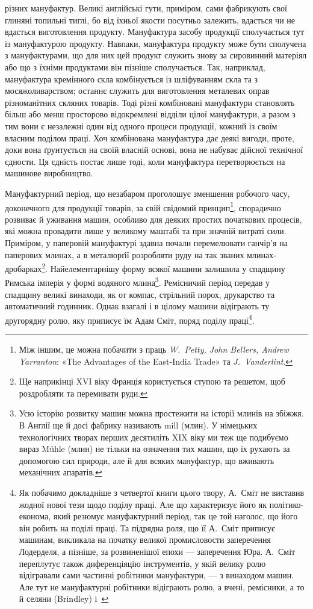 \parcont{}  %
різних мануфактур. Великі англійські гути, приміром, сами
фабрикують свої глиняні топильні тиглі, бо від їхньої якости
посутньо залежить, вдасться чи не вдасться виготовлення продукту.
Мануфактура засобу продукції сполучається тут із мануфактурою
продукту. Навпаки, мануфактура продукту може бути
сполучена з мануфактурами, що для них цей продукт служить
знову за сировинний матеріял або що з їхніми продуктами він
пізніше сполучається. Так, наприклад, мануфактура кремінного
скла комбінується із шліфуванням скла та з мосяжоливарством;
останнє служить для виготовлення металевих оправ різноманітних
скляних товарів. Тоді різні комбіновані мануфактури
становлять більш або менш просторово відокремлені відділи цілої
мануфактури, а разом з тим вони є незалежні один від одного
процеси продукції, кожний із своїм власним поділом праці. Хоч
комбінована мануфактура дає деякі вигоди, проте, доки вона
ґрунтується на своїй власній основі, вона не набуває дійсної
технічної єдности. Ця єдність постає лише тоді, коли мануфактура
перетворюється на машинове виробництво.

Мануфактурний період, що незабаром проголошує зменшення
робочого часу, доконечного для продукції товарів, за свій свідомий
принцип\footnote{
Між іншим, це можна побачити з праць \emph{W.~Petty, John Bellers,
Andrew Yarranton}: «The Advantages of the East-India Trade» та \emph{J.~Vanderlint}.
}, спорадично розвиває й уживання машин, особливо
для деяких простих початкових процесів, які можна провадити
лише у великому маштабі та при значній витраті сили. Приміром,
у паперовій мануфактурі здавна почали перемелювати ганчір’я
на паперових млинах, а в металюрґії розробляти руду на так
званих млинах-дробарках\footnote{
Ще наприкінці XVI віку Франція користується ступою та решетом,
щоб роздробляти та перемивати руди.
}. Найелементарнішу форму всякої
машини залишила у спадщину Римська імперія у формі водяного
млина\footnote{
Усю історію розвитку машин можна простежити на історії млинів
на збіжжя. В Англії ще й досі фабрику називають mill (млин). У
німецьких технологічних творах перших десятиліть XIX віку ми теж
ще подибуємо вираз Mühle (млин) не тільки на означення тих машин,
що їх рухають за допомогою сил природи, але й для всяких мануфактур,
що вживають механічних апаратів.
}. Ремісничий період передав у спадщину великі винаходи,
як от компас, стрільний порох, друкарство та автоматичний
годинник. Однак взагалі і в цілому машини відіграють ту другорядну
ролю, яку приписує їм Адам Сміт, поряд поділу праці\footnote{
Як побачимо докладніше з четвертої книги цього твору, А.~Сміт
не виставив жодної нової тези щодо поділу праці. Але що характеризує
його як політико-економа, який резюмує мануфактурний період, так
це той наголос, що його він робить на поділі праці. Та підрядна роля,
що її А.~Сміт приписує машинам, викликала на початку великої промисловости
заперечення Лодерделя, а пізніше, за розвиненішої епохи —
заперечення Юра. А.~Сміт переплутує також диференціяцію інструментів,
у якій велику ролю відігравали сами частинні робітники мануфактури,
— з винаходом машин. Але тут не мануфактурні робітники
відіграють ролю, а вчені, ремісники, а то й селяни (Brindley) і~
}.
\parbreak{}  %
